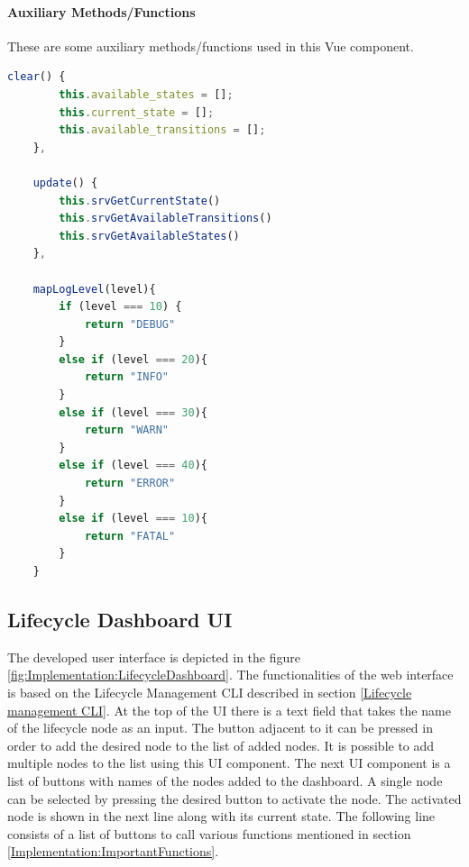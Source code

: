 \paragraph{Auxiliary Methods/Functions} These are some auxiliary methods/functions used in this Vue component.
\label{Implementation:Auxillary functions}
\begin{lstlisting}[language=JavaScript,
	caption={Auxillary functions}, 
	label={code:Auxillary functions}]
	clear() {
		this.available_states = [];
		this.current_state = [];
		this.available_transitions = [];
	},

	update() {
		this.srvGetCurrentState()
		this.srvGetAvailableTransitions()
		this.srvGetAvailableStates()
	},

	mapLogLevel(level){
		if (level === 10) {
			return "DEBUG"
		} 
		else if (level === 20){
			return "INFO"
		}
		else if (level === 30){
			return "WARN"
		}
		else if (level === 40){
			return "ERROR"
		}
		else if (level === 10){
			return "FATAL"
		}
	}
\end{lstlisting}
		

\subsection{Lifecycle Dashboard UI}
The developed user interface is depicted in the figure \ref{fig:Implementation:LifecycleDashboard}. 
The functionalities of the web interface is based on the Lifecycle Management CLI described in section \ref{Lifecycle management CLI}. At the top of the UI there is a text field that takes the name of the lifecycle node as an input. The button adjacent to it can be pressed in order to add the desired node to the list of added nodes. It is possible to add multiple nodes to the list using this UI component.
The next UI component is a list of buttons with names of the nodes added to the dashboard. A single node can be selected by pressing the desired button to activate the node. The activated node is shown in the next line along with its current state. The following line consists of a list of buttons to call various functions mentioned in section \ref*{Implementation:ImportantFunctions}.
\\

